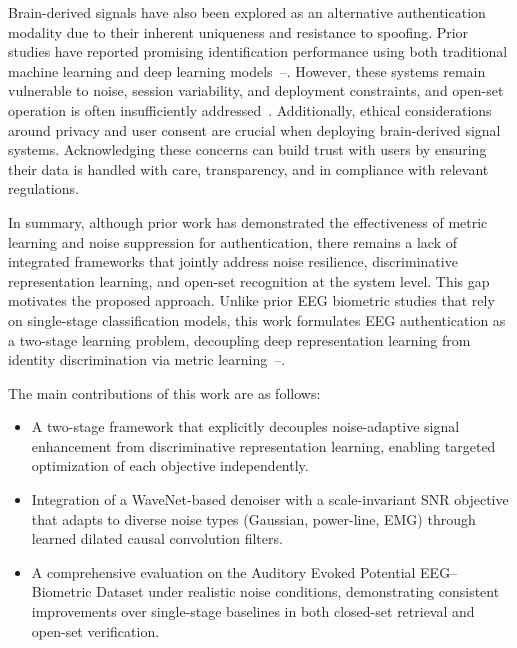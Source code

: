 \documentclass[conference]{IEEEtran}
\begin{document}
Brain-derived signals have also been explored as an alternative authentication modality due to their inherent uniqueness and resistance to spoofing. Prior studies have reported promising identification performance using both traditional machine learning and deep learning models~\cite{b1}--\cite{b3}. However, these systems remain vulnerable to noise, session variability, and deployment constraints, and open-set operation is often insufficiently addressed~\cite{b4}. Additionally, ethical considerations around privacy and user consent are crucial when deploying brain-derived signal systems. Acknowledging these concerns can build trust with users by ensuring their data is handled with care, transparency, and in compliance with relevant regulations.

In summary, although prior work has demonstrated the effectiveness of metric learning and noise suppression for authentication, there remains a lack of integrated frameworks that jointly address noise resilience, discriminative representation learning, and open-set recognition at the system level. This gap motivates the proposed approach. Unlike prior EEG biometric studies that rely on single-stage classification models, this work formulates EEG authentication as a two-stage learning problem, decoupling deep representation learning from identity discrimination via metric learning~\cite{b5}--\cite{b8}.

The main contributions of this work are as follows:
\begin{itemize}
    \item A two-stage framework that explicitly decouples noise-adaptive signal enhancement from discriminative representation learning, enabling targeted optimization of each objective independently.
    \item Integration of a WaveNet-based denoiser with a scale-invariant SNR objective that adapts to diverse noise types (Gaussian, power-line, EMG) through learned dilated causal convolution filters.
    \item A comprehensive evaluation on the Auditory Evoked Potential EEG--Biometric Dataset under realistic noise conditions, demonstrating consistent improvements over single-stage baselines in both closed-set retrieval and open-set verification.
\end{itemize}

\end{document}
